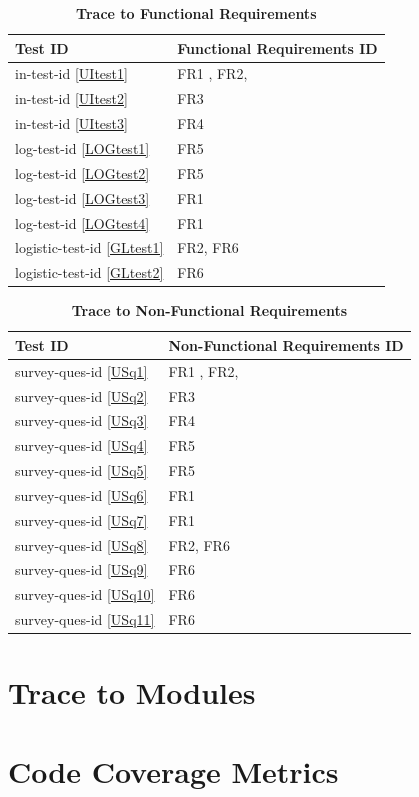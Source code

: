 \documentclass[12pt, titlepage]{article}
\newcommand{\UIref}[1]{in-test-id \ref{#1}}
\newcommand{\LOGref}[1]{log-test-id \ref{#1}}
\newcommand{\GLref}[1]{logistic-test-id \ref{#1}}
\newcommand{\USref}[1]{survey-ques-id \ref{#1}}
\begin{document}
\begin{table}[H]
\caption{\textbf{Trace to Functional Requirements}} \label{TbTrace}
\begin{tabularx}{\textwidth}{p{3cm}X}
\toprule
\textbf{Test ID} & \textbf{Functional Requirements ID} \\
\midrule

\UIref{UItest1} & FR1 , FR2,  \\
\UIref{UItest2} & FR3 \\
\UIref{UItest3} & FR4 \\
\LOGref{LOGtest1} & FR5\\
\LOGref{LOGtest2} & FR5\\
\LOGref{LOGtest3} & FR1\\
\LOGref{LOGtest4}  & FR1\\
\GLref{GLtest1} & FR2, FR6\\
\GLref{GLtest2} & FR6\\

\bottomrule
\end{tabularx}
\end{table}

\begin{table}[H]
\caption{\textbf{Trace to Non-Functional Requirements}} \label{TbTrace}
\begin{tabularx}{\textwidth}{p{3.1cm}X}
\toprule
\textbf{Test ID} & \textbf{Non-Functional Requirements ID} \\
\midrule

\USref{USq1} & FR1 , FR2,  \\
\USref{USq2} & FR3 \\
\USref{USq3} & FR4 \\
\USref{USq4} & FR5\\
\USref{USq5} & FR5\\
\USref{USq6} & FR1\\
\USref{USq7} & FR1\\
\USref{USq8} & FR2, FR6\\
\USref{USq9} & FR6\\
\USref{USq10} & FR6\\
\USref{USq11} & FR6\\

\bottomrule
\end{tabularx}
\end{table}
		
\section{Trace to Modules}		

\section{Code Coverage Metrics}




\end{document}

